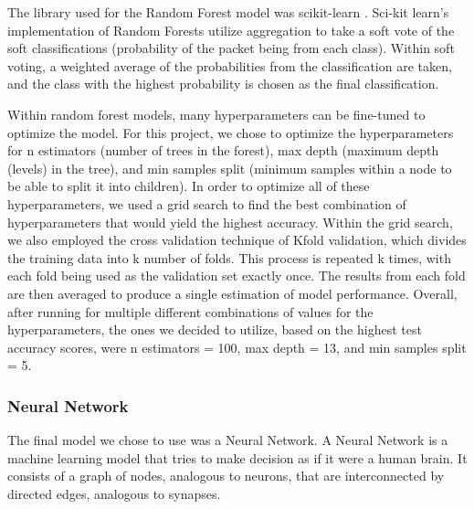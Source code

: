 \documentclass[10pt,sigconf,letterpaper,nonacm]{acmart}
\begin{document}
The library used for the Random Forest model was scikit-learn \cite{scikit-learn}. Sci-kit learn's implementation of Random Forests utilize aggregation to take a soft vote of the soft classifications (probability of the packet being from each class). Within soft voting, a weighted average of the probabilities from the classification are taken, and the class with the highest probability is chosen as the final classification.

Within random forest models, many hyperparameters can be fine-tuned to optimize the model. For this project, we chose to optimize the hyperparameters for n estimators (number of trees in the forest), 
max depth (maximum depth (levels) in the tree), and min samples split (minimum samples within a node to be able to split it into children). In order to optimize all of these hyperparameters, we used a grid search to find the best combination of hyperparameters that would 
yield the highest accuracy. Within the grid search, we also employed the cross validation technique of Kfold validation, which divides the training data into k number of folds. This process is repeated k times, with each fold being used as the validation set exactly once. The results from each fold are then averaged to produce a single estimation of model performance. Overall, after running for multiple different combinations of values for the 
hyperparameters, the ones we decided to utilize, based on the highest test accuracy scores, were n estimators = 100, max depth = 13, and min samples split = 5. 

\subsubsection{Neural Network}

The final model we chose to use was a Neural Network.
A Neural Network is a machine learning model that tries to make decision as if it were a human brain. 
It consists of a graph of nodes, analogous to neurons, that are interconnected by directed edges, analogous to synapses.
\end{document}
